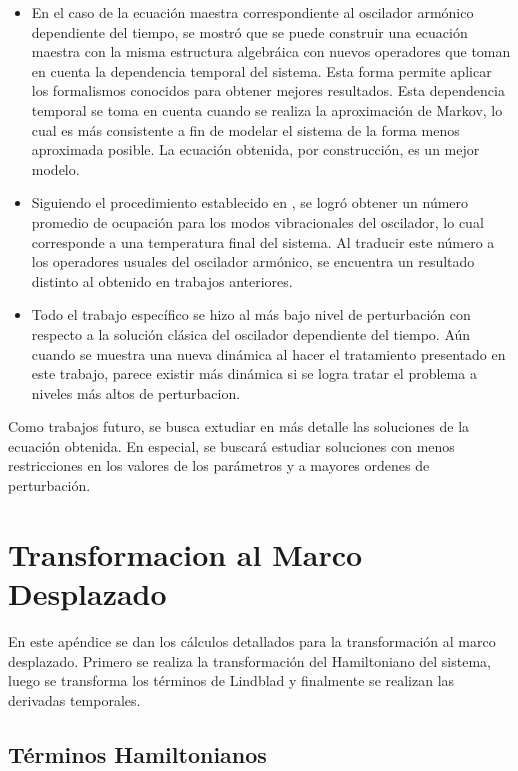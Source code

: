 \documentclass[a4paper,10pt]{report}
\begin{document}
\begin{itemize}
\item En el caso de la ecuación maestra correspondiente al oscilador armónico dependiente del tiempo, se mostró que se puede construir una ecuación maestra con la misma estructura algebráica con nuevos operadores que toman en cuenta la dependencia temporal del sistema. Esta forma permite aplicar los formalismos conocidos para obtener mejores resultados. Esta dependencia temporal se toma en cuenta cuando se realiza la aproximación de Markov, lo cual es más consistente a fin de modelar el sistema de la forma menos aproximada posible. La ecuación obtenida, por construcción, es un mejor modelo.

\item Siguiendo el procedimiento establecido en \cite{BarberisLC}, se logró obtener un número promedio de ocupación para los modos vibracionales del oscilador, lo cual corresponde a una temperatura final del sistema. Al traducir este número a los operadores usuales del oscilador armónico, se encuentra un resultado distinto al obtenido en trabajos anteriores.

\item Todo el trabajo específico se hizo al más bajo nivel de perturbación con respecto a la solución clásica del oscilador dependiente del tiempo. Aún cuando se muestra una nueva dinámica al hacer el tratamiento presentado en este trabajo, parece existir más dinámica si se logra tratar el problema a niveles más altos de perturbacion.
\end{itemize}

Como trabajos futuro, se busca extudiar en más detalle las soluciones de la ecuación obtenida. En especial, se buscará estudiar soluciones con menos restricciones en los valores de los parámetros y a mayores ordenes de perturbación.




\appendix

\chapter{Transformacion al Marco Desplazado}

En este apéndice se dan los cálculos detallados para la transformación al marco desplazado. Primero se realiza la transformación del Hamiltoniano del sistema, luego se transforma los términos de Lindblad y finalmente se realizan las derivadas temporales.

\section{Términos Hamiltonianos}
\end{document}
